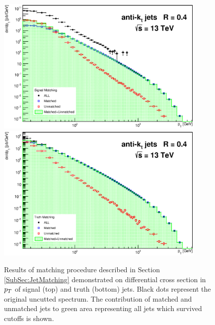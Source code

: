 \begin{appendices}
\begin{figure}[p]
  \centering
  \includegraphics[width=0.9\textwidth]{Chapter3/SignalMatching.eps}
  \includegraphics[width=0.9\textwidth]{Chapter3/TruthMatching.eps}
  \caption{Results of matching procedure described in Section
  \ref{SubSec:JetMatching} demonstrated on differential cross section in $p_{T}$ of
  signal (top) and truth (bottom) jets. Black dots represent the original
  uncutted spectrum. The contribution of matched and unmatched jets to
  green area representing all jets which survived cutoffs is shown.}
  \label{fig:Matching}
\end{figure}


\end{appendices}
